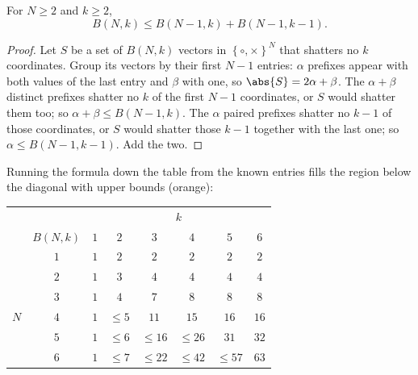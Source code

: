 \begin{lemma}\label{lem:B-recursion}
    For \(N \ge 2\) and \(k \ge 2\),
    \[
        B(N, k) \le B(N - 1, k) + B(N - 1, k - 1) .
    \]
\end{lemma}

\begin{proof}
    Let \(S\) be a set of \(B(N, k)\) vectors in \(\left\{ \circ, \times
    \right\}^N\) that shatters no \(k\) coordinates. Group its vectors by their
    first \(N - 1\) entries: \(\alpha\) prefixes appear with both values of the
    last entry and \(\beta\) with one, so \(\abs{S} = 2\alpha + \beta\). The
    \(\alpha + \beta\) distinct prefixes shatter no \(k\) of the first \(N - 1\)
    coordinates, or \(S\) would shatter them too; so \(\alpha + \beta \le
    B(N - 1, k)\). The \(\alpha\) paired prefixes shatter no \(k - 1\) of those
    coordinates, or \(S\) would shatter those \(k - 1\) together with the last
    one; so \(\alpha \le B(N - 1, k - 1)\). Add the two.
\end{proof}

Running the formula down the table from the known entries fills the region
below the diagonal with upper bounds (orange):

\begin{center}
    \solidrules
    \begin{tabular}{@{}cc|cccccc@{}}
        \toprule
        & & \multicolumn{6}{c}{\(k\)}\\
        & \(B(N, k)\) & \(1\) & \(2\) & \(3\) & \(4\) & \(5\) & \(6\)\\
        \midrule
        & \(1\) & \(1\) & \(2\) & \(2\) & \(2\) & \(2\) & \(2\)\\
        & \(2\) & \(1\) & \(3\) & \(4\) & \(4\) & \(4\) & \(4\)\\
        & \(3\) & \(1\) & \cellcolor{singlerowalt}\(4\)
        & \cellcolor{singlerowalt}\(7\) & \(8\) & \(8\) & \(8\)\\
        \(N\) & \(4\) & \(1\) & \textcolor{orange!85!black}{\(\le 5\)}
        & \cellcolor{singlerowalt}\(11\) & \(15\) & \(16\) & \(16\)\\
        & \(5\) & \(1\) & \textcolor{orange!85!black}{\(\le 6\)}
        & \textcolor{orange!85!black}{\(\le 16\)}
        & \textcolor{orange!85!black}{\(\le 26\)} & \(31\) & \(32\)\\
        & \(6\) & \(1\) & \textcolor{orange!85!black}{\(\le 7\)}
        & \textcolor{orange!85!black}{\(\le 22\)}
        & \textcolor{orange!85!black}{\(\le 42\)}
        & \textcolor{orange!85!black}{\(\le 57\)} & \(63\)\\
        \bottomrule
    \end{tabular}
\end{center}

